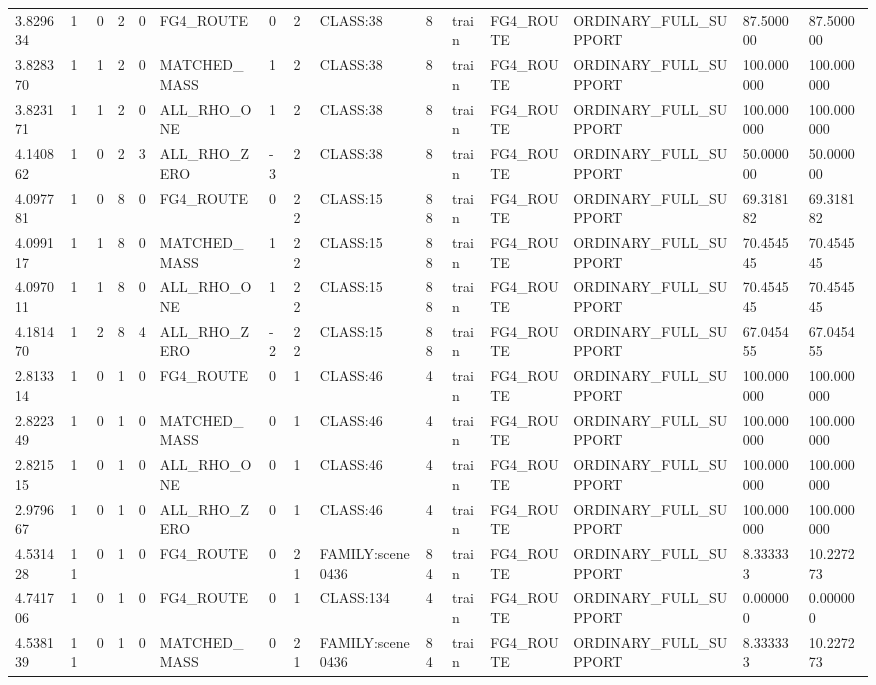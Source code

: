 \begin{tabular}{lllllllllllllll}
3.829634 & 1 & 0 & 2 & 0 & FG4\_ROUTE & 0 & 2 & CLASS:38 & 8 & train & FG4\_ROUTE & ORDINARY\_FULL\_SUPPORT & 87.500000 & 87.500000 \\
3.828370 & 1 & 1 & 2 & 0 & MATCHED\_MASS & 1 & 2 & CLASS:38 & 8 & train & FG4\_ROUTE & ORDINARY\_FULL\_SUPPORT & 100.000000 & 100.000000 \\
3.823171 & 1 & 1 & 2 & 0 & ALL\_RHO\_ONE & 1 & 2 & CLASS:38 & 8 & train & FG4\_ROUTE & ORDINARY\_FULL\_SUPPORT & 100.000000 & 100.000000 \\
4.140862 & 1 & 0 & 2 & 3 & ALL\_RHO\_ZERO & -3 & 2 & CLASS:38 & 8 & train & FG4\_ROUTE & ORDINARY\_FULL\_SUPPORT & 50.000000 & 50.000000 \\
4.097781 & 1 & 0 & 8 & 0 & FG4\_ROUTE & 0 & 22 & CLASS:15 & 88 & train & FG4\_ROUTE & ORDINARY\_FULL\_SUPPORT & 69.318182 & 69.318182 \\
4.099117 & 1 & 1 & 8 & 0 & MATCHED\_MASS & 1 & 22 & CLASS:15 & 88 & train & FG4\_ROUTE & ORDINARY\_FULL\_SUPPORT & 70.454545 & 70.454545 \\
4.097011 & 1 & 1 & 8 & 0 & ALL\_RHO\_ONE & 1 & 22 & CLASS:15 & 88 & train & FG4\_ROUTE & ORDINARY\_FULL\_SUPPORT & 70.454545 & 70.454545 \\
4.181470 & 1 & 2 & 8 & 4 & ALL\_RHO\_ZERO & -2 & 22 & CLASS:15 & 88 & train & FG4\_ROUTE & ORDINARY\_FULL\_SUPPORT & 67.045455 & 67.045455 \\
2.813314 & 1 & 0 & 1 & 0 & FG4\_ROUTE & 0 & 1 & CLASS:46 & 4 & train & FG4\_ROUTE & ORDINARY\_FULL\_SUPPORT & 100.000000 & 100.000000 \\
2.822349 & 1 & 0 & 1 & 0 & MATCHED\_MASS & 0 & 1 & CLASS:46 & 4 & train & FG4\_ROUTE & ORDINARY\_FULL\_SUPPORT & 100.000000 & 100.000000 \\
2.821515 & 1 & 0 & 1 & 0 & ALL\_RHO\_ONE & 0 & 1 & CLASS:46 & 4 & train & FG4\_ROUTE & ORDINARY\_FULL\_SUPPORT & 100.000000 & 100.000000 \\
2.979667 & 1 & 0 & 1 & 0 & ALL\_RHO\_ZERO & 0 & 1 & CLASS:46 & 4 & train & FG4\_ROUTE & ORDINARY\_FULL\_SUPPORT & 100.000000 & 100.000000 \\
4.531428 & 11 & 0 & 1 & 0 & FG4\_ROUTE & 0 & 21 & FAMILY:scene0436 & 84 & train & FG4\_ROUTE & ORDINARY\_FULL\_SUPPORT & 8.333333 & 10.227273 \\
4.741706 & 1 & 0 & 1 & 0 & FG4\_ROUTE & 0 & 1 & CLASS:134 & 4 & train & FG4\_ROUTE & ORDINARY\_FULL\_SUPPORT & 0.000000 & 0.000000 \\
4.538139 & 11 & 0 & 1 & 0 & MATCHED\_MASS & 0 & 21 & FAMILY:scene0436 & 84 & train & FG4\_ROUTE & ORDINARY\_FULL\_SUPPORT & 8.333333 & 10.227273 \\

\end{tabular}
